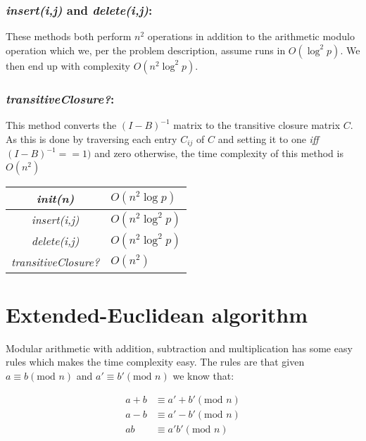 \documentclass[a4paper,oneside,article]{memoir}
\begin{document}
\subsubsection{\textit{insert(i,j)} and \textit{delete(i,j)}:}
These methods both perform $n^2$ operations in addition to the
arithmetic modulo operation which we, per the problem description,
assume runs in $O(\log^2p)$. We then end up with complexity
$O(n^2\log^2p)$.
\subsubsection{\textit{transitiveClosure?}:}
This method converts the $(I - B)^{-1}$ matrix to the transitive closure matrix $C$.
As this is done by traversing each entry $C_{ij}$ of $C$ and setting it to one \textit{iff} $(I - B)^{-1} == 1)$ and zero otherwise, the time complexity of this method is $O(n^2)$ 

\begin{center}
\begin{tabular}{|c|l|}
  \hline

  \textit{init(n)} & $O(n^2\log p)$ \\ \hline
  \textit{insert(i,j)} &  $O(n^2\log^2p)$ \\ \hline
  \textit{delete(i,j)} &  $O(n^2\log^2p)$ \\ \hline
  \textit{transitiveClosure?} & $O(n^2)$ \\
  \hline
\end{tabular}
\end{center}

\section{Extended-Euclidean algorithm}
Modular arithmetic with addition, subtraction and multiplication has some easy rules which makes the time complexity easy. The rules are that given $a \equiv b (\text{mod } n)$ and $a' \equiv b' (\text{mod } n)$ we know that:

\begin{align*}
  a+b &\equiv a'+b' (\text{mod } n) \\
  a-b &\equiv a'-b' (\text{mod } n) \\
  ab &\equiv a'b' (\text{mod } n)
\end{align*}
\end{document}
